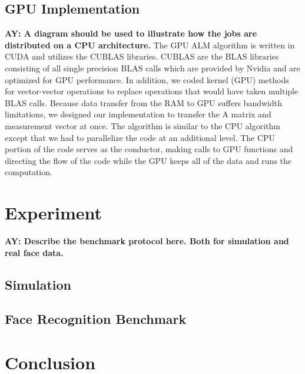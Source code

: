 \documentclass[10pt,twocolumn,letterpaper]{article}
\begin{document}
\subsection{GPU Implementation}
{\bf AY: A diagram should be used to illustrate how the jobs are distributed on a CPU architecture.}
The GPU ALM algorithm is written in CUDA and utilizes the CUBLAS libraries.
CUBLAS are the BLAS libraries consisting of all single precision BLAS calls
which are provided by Nvidia and are optimized for GPU performance. In
addition, we coded kernel (GPU) methods for vector-vector operations to replace
operations that would have taken multiple BLAS calls. Because data transfer from the RAM to GPU suffers bandwidth limitations, we designed our implementation to transfer the A matrix and measurement vector at once.  The algorithm is similar
to the CPU algorithm except that we had to parallelize the code at an
additional level. The CPU portion of the code serves as the conductor, making
calls to GPU functions and directing the flow of the code while the GPU keeps all of the data and runs the computation.

\section{Experiment}
{\bf AY: Describe the benchmark protocol here. Both for simulation and real face data.}

\subsection{Simulation}

\subsection{Face Recognition Benchmark}

\section{Conclusion}

{\small


}
\end{document}
